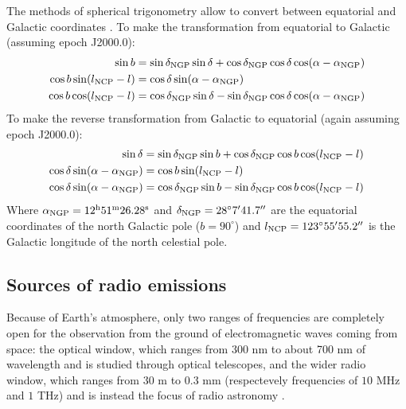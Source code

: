 The methods of spherical trigonometry allow to convert between equatorial and Galactic coordinates \Cite{carroll_introduction_2007}. To make the transformation from equatorial to Galactic (assuming epoch J2000.0):
\begin{align}
    \sin b &= \sin \delta_{\text{NGP}} \sin \delta + \cos \delta_{\text{NGP}} \cos \delta \cos (\alpha - \alpha_{\text{NGP}}) \\
    \cos b \sin(l_{\text{NCP}} - l) &= \cos \delta \sin(\alpha - \alpha_{\text{NGP}}) \\
    \cos b \cos (l_{\text{NCP}} - l) &= \cos \delta_{\text{NGP}} \sin \delta - \sin \delta_{\text{NGP}} \cos \delta \cos(\alpha - \alpha_{\text{NGP}})
\end{align}
To make the reverse transformation from Galactic to equatorial (again assuming epoch J2000.0):
\begin{align}
    \sin \delta &= \sin \delta_{\text{NGP}} \sin b + \cos \delta_{\text{NGP}} \cos b \cos (l_{\text{NCP}} - l) \\
    \cos \delta \sin(\alpha - \alpha_{\text{NGP}}) &= \cos b \sin(l_{\text{NCP}} - l) \\
    \cos \delta \sin(\alpha - \alpha_{\text{NGP}}) &= \cos \delta_{\text{NGP}} \sin b - \sin \delta_{\text{NGP}} \cos b \cos (l_{\text{NCP}} - l)
\end{align}
Where $\alpha_{\text{NGP}} = 12^{\text{h}} 51^{\text{m}} 26.28^{\text{s}}$ and $\delta_{\text{NGP}} = 28^{\circ}7' 41.7''$ are the equatorial coordinates of the north Galactic pole ($b = 90^{\circ}$) and $l_{\text{NCP}} = 123^{\circ} 55' 55.2''$ is the Galactic longitude of the north celestial pole.

\subsection{Sources of radio emissions}
Because of Earth's atmosphere, only two ranges of frequencies are completely open for the observation from the ground of electromagnetic waves coming from space: the optical window, which ranges from 300 nm to about 700 nm of wavelength and is studied through optical telescopes, and the wider radio window, which ranges from $30$ m to $0.3$ mm (respectevely frequencies of $10$ MHz and $1$ THz) and is instead the focus of radio astronomy \cite{condon_essential_2016}.

